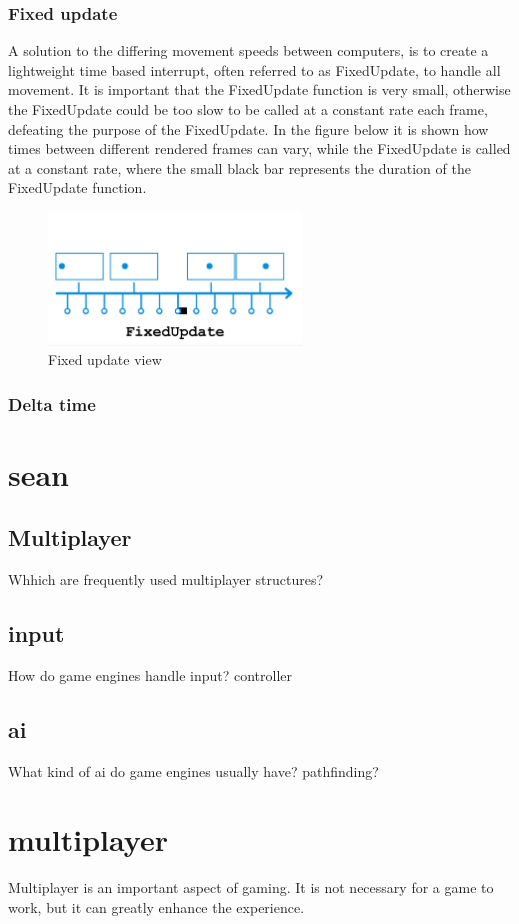 \documentclass{article} %
\begin{document}
\subsubsection{Fixed update}
A solution to the differing movement speeds between computers, is to create a lightweight time based interrupt, often referred to as FixedUpdate, to handle all movement.
It is important that the FixedUpdate function is very small, otherwise the FixedUpdate could be too slow to be called at a constant rate each frame, defeating the purpose of the FixedUpdate.
In the figure below it is shown how times between different rendered frames can vary, while the FixedUpdate is called at a constant rate, where the small black bar represents the duration of the FixedUpdate function.
\begin{figure}[h!]
    \centering
    \includegraphics[width=0.6\textwidth]{fixed_update_explanation.png}
    \caption{Fixed update view}
\end{figure}
\subsubsection{Delta time}

\newpage
\section{sean}
\subsection{Multiplayer}
Whhich are frequently used multiplayer structures?
\subsection{input}
How do game engines handle input?
controller
\subsection{ai}
What kind of ai do game engines usually have?
pathfinding?
\newpage

\section{multiplayer}
Multiplayer is an important aspect of gaming. It is not necessary for a game to work, but it can greatly enhance the experience.
\end{document}
